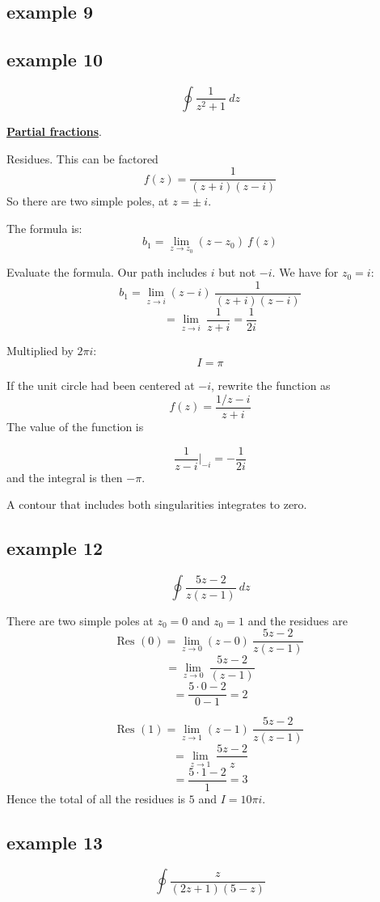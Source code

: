 \documentclass[11pt, oneside]{article}
\begin{document}
\subsection*{example 9}

\subsection*{example 10}
\[ \oint \frac{1}{z^2 + 1} \ dz \]

\hyperref[sec:ex10PF]{\textbf{Partial fractions}}.

Residues. This can be factored
\[ f(z) = \frac{1}{(z + i)(z - i)} \]
So there are two simple poles, at $z = \pm \ i$.

The formula is:
\[ b_1 = \lim_{z \rightarrow z_0} (z-z_0) \ f(z)  \]

Evaluate the formula.  Our path includes $i$ but not $-i$.  We have for $z_0 = i$:
\[ b_1 = \lim_{z \rightarrow i} (z-i) \  \frac{1}{(z+i)(z-i)} \]
\[ = \lim_{z \rightarrow i}  \  \frac{1}{z+i} = \frac{1}{2i} \]

Multiplied by $2 \pi i$:
\[ I = \pi \]

If the unit circle had been centered at $-i$, rewrite the function as
\[ f(z) = \frac{1/z-i}{z+i} \]
The value of the function is

\[ \frac{1}{z-i} \bigg |_{-i} = -\frac{1}{2i} \]
and the integral is then $- \pi$.

A contour that includes both singularities integrates to zero.

\subsection*{example 12}
\[ \oint \frac{5z - 2}{z(z - 1)} \ dz \]

There are two simple poles at $z_0 = 0$ and $z_0 = 1$ and the residues are
\[ \text{Res }(0) = \lim_{z \rightarrow 0} (z - 0) \ \frac{5z-2}{z(z-1)} \]
\[ = \lim_{z \rightarrow 0} \ \frac{5z-2}{(z-1)} \]
\[ = \frac{5 \cdot 0 - 2}{0 - 1} = 2 \]

\[ \text{Res }(1) = \lim_{z \rightarrow 1} (z - 1) \ \frac{5z-2}{z(z-1)} \]
\[ = \lim_{z \rightarrow 1} \ \frac{5z-2}{z} \]
\[ = \frac{5 \cdot 1 - 2}{1} = 3 \]
Hence the total of all the residues is $5$ and $I = 10 \pi i$.

\subsection*{example 13}
\[ \oint \frac{z}{(2z + 1)(5 - z)} \]
\end{document}
